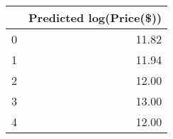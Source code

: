 \begin{tabular}{lr}
\toprule
{} &  Predicted log(Price(\$)) \\
\midrule
0 &                    11.82 \\
1 &                    11.94 \\
2 &                    12.00 \\
3 &                    13.00 \\
4 &                    12.00 \\
\bottomrule
\end{tabular}
